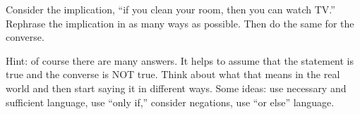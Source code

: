 \begin{questions}
\begin{answer}
  \end{answer}


\question Consider the implication, ``if you clean your room, then you can watch TV.''  Rephrase the implication in as many ways as possible.  Then do the same for the converse.

  \begin{answer}
    Hint: of course there are many answers.  It helps to assume that the statement is true and the converse is NOT true.  Think about what that means in the real world and then start saying it in different ways.  Some ideas: use necessary and sufficient language, use ``only if,'' consider negations, use ``or else'' language.
  \end{answer}



\end{questions}
